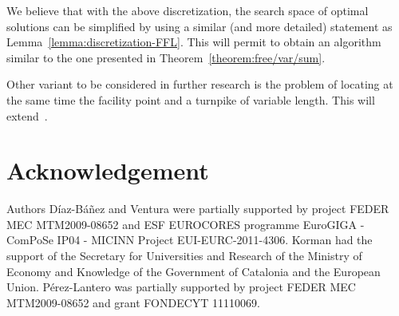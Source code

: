 \documentclass[11pt,a4paper,oneside,onecolumn]{article}
\begin{document}
We believe that with the above discretization, the search space of
optimal solutions can be simplified by using a similar (and more detailed)
statement as Lemma~\ref{lemma:discretization-FFL}. This will permit
to obtain an algorithm similar to the one presented 
in Theorem~\ref{theorem:free/var/sum}.

Other variant to be considered in further research is the problem of locating at the
same time the facility point and a turnpike of variable length. This will
extend~\cite{diaz-banez11,espejo11}.


\section*{Acknowledgement}

Authors D\'iaz-B\'a\~nez and Ventura were partially supported by 
project FEDER MEC MTM2009-08652 and ESF EUROCORES programme 
EuroGIGA - ComPoSe IP04 - MICINN 
Project EUI-EURC-2011-4306. 
Korman had the support of the Secretary for 
Universities and Research of the Ministry of Economy and Knowledge of the 
Government of Catalonia and the European Union.
P\'erez-Lantero was partially supported by project FEDER MEC MTM2009-08652 and
grant FONDECYT 11110069.

\nocite{*}

\small



\end{document}
